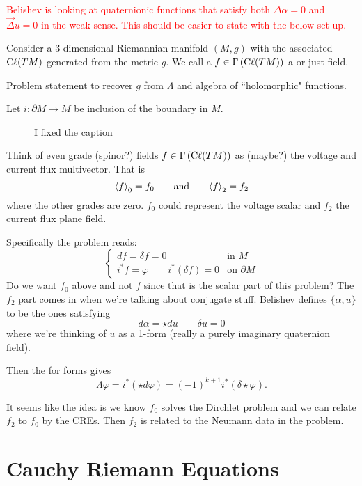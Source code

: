 \textcolor{red}{Belishev is looking at quaternionic functions that satisfy both $\Delta \alpha=0$ and $\vec{\Delta}u=0$ in the weak sense. This should be easier to state with the below set up.}

Consider a $3$-dimensional Riemannian manifold $(M,g)$ with the associated  $\mathrm{C}\ell(TM)$ generated from the metric $g$. We call a $f\in \Gamma\left(\mathrm{C}\ell(TM)\right)$ a  or just field.  

\begin{problem}
Problem statement to recover $g$ from $\Lambda$ and algebra of ``holomorphic" functions.
\end{problem}

Let $i\colon \partial M \to M$ be inclusion of the boundary in $M$.


\begin{figure}[H]
  \centering
  
  \caption{I fixed the caption}
  \label{fig: broken_caption_is_stupid}
\end{figure}

Think of even grade (spinor?) fields $f\in \Gamma\left(\mathrm{C}\ell(TM)\right)$ as (maybe?) the voltage and current flux multivector. That is
\[
\projzero{f} = f_0 \qquad \textrm{and} \qquad \projtwo{f}=f_2
\]
where the other grades are zero. $f_0$ could represent the voltage scalar and $f_2$ the current flux plane field.

Specifically the problem reads:
\[
\begin{cases}
df=\delta f = 0 &\textrm{in $M$}\\
i^* f = \varphi \qquad i^*(\delta f)=0 & \textrm{on $\partial M$}
\end{cases}
\]
Do we want $f_0$ above and not $f$ since that is the scalar part of this problem? The $f_2$ part comes in when we're talking about conjugate stuff. Belishev defines  $\{\alpha,u\}$ to be the ones satisfying 
\[
d\alpha = \star d u \qquad \delta u=0
\]
where we're thinking of $u$ as a 1-form (really a purely imaginary quaternion field).

Then the  for forms gives
\[
\Lambda \varphi = i^*(\star d \varphi) = (-1)^{k+1}i^*(\delta \star \varphi).
\]

It seems like the idea is we know $f_0$ solves the Dirchlet problem and we can relate $f_2$ to $f_0$ by the CREs. Then $f_2$ is related to the Neumann data in the problem.

\section{Cauchy Riemann Equations}

